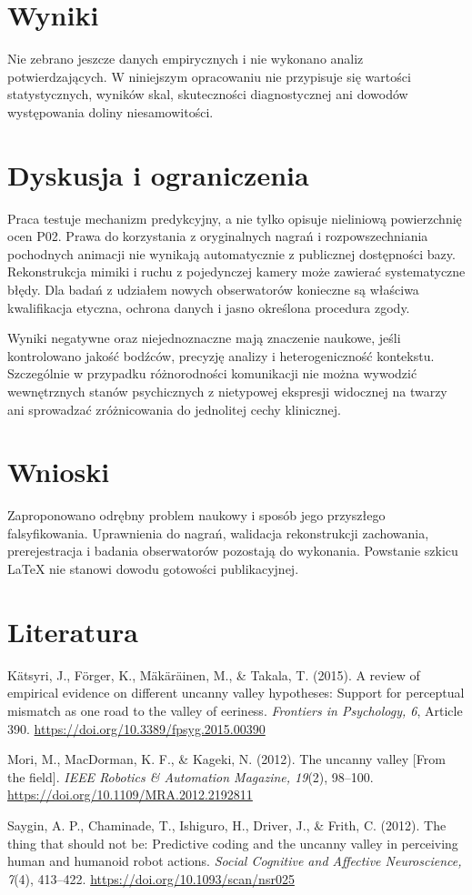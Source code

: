 \documentclass[11pt,a4paper]{article}
\begin{document}
\section{Wyniki}
Nie zebrano jeszcze danych empirycznych i nie wykonano analiz potwierdzających. W niniejszym opracowaniu nie przypisuje się wartości statystycznych, wyników skal, skuteczności diagnostycznej ani dowodów występowania doliny niesamowitości.
\section{Dyskusja i ograniczenia}
Praca testuje mechanizm predykcyjny, a nie tylko opisuje nieliniową powierzchnię ocen P02. Prawa do korzystania z oryginalnych nagrań i rozpowszechniania pochodnych animacji nie wynikają automatycznie z publicznej dostępności bazy. Rekonstrukcja mimiki i ruchu z pojedynczej kamery może zawierać systematyczne błędy. Dla badań z udziałem nowych obserwatorów konieczne są właściwa kwalifikacja etyczna, ochrona danych i jasno określona procedura zgody.

Wyniki negatywne oraz niejednoznaczne mają znaczenie naukowe, jeśli kontrolowano jakość bodźców, precyzję analizy i heterogeniczność kontekstu. Szczególnie w przypadku różnorodności komunikacji nie można wywodzić wewnętrznych stanów psychicznych z nietypowej ekspresji widocznej na twarzy ani sprowadzać zróżnicowania do jednolitej cechy klinicznej.
\section{Wnioski}
Zaproponowano odrębny problem naukowy i sposób jego przyszłego falsyfikowania. Uprawnienia do nagrań, walidacja rekonstrukcji zachowania, prerejestracja i badania obserwatorów pozostają do wykonania. Powstanie szkicu LaTeX nie stanowi dowodu gotowości publikacyjnej.
\section*{Literatura}
\begin{description}
\item Kätsyri, J., Förger, K., Mäkäräinen, M., \& Takala, T. (2015). A review of empirical evidence on different uncanny valley hypotheses: Support for perceptual mismatch as one road to the valley of eeriness. \textit{Frontiers in Psychology, 6}, Article 390. \url{https://doi.org/10.3389/fpsyg.2015.00390}
\item Mori, M., MacDorman, K. F., \& Kageki, N. (2012). The uncanny valley [From the field]. \textit{IEEE Robotics \& Automation Magazine, 19}(2), 98--100. \url{https://doi.org/10.1109/MRA.2012.2192811}
\item Saygin, A. P., Chaminade, T., Ishiguro, H., Driver, J., \& Frith, C. (2012). The thing that should not be: Predictive coding and the uncanny valley in perceiving human and humanoid robot actions. \textit{Social Cognitive and Affective Neuroscience, 7}(4), 413--422. \url{https://doi.org/10.1093/scan/nsr025}
\end{description}
\end{document}
